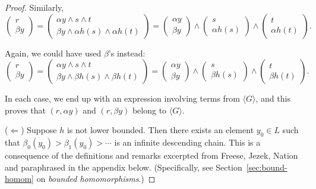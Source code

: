 \begin{proof}
Similarly,
\[\left(\begin{array}{c} r \\ \beta y\end{array}\right) = 
\left(\begin{array}{c} \alpha y \wedge s\wedge t \\ \beta y \wedge \alpha {h(s)} \wedge \alpha {h(t)} \end{array}\right) = 
\left(\begin{array}{c} \alpha y\\ \beta y\end{array}\right) \wedge 
\left(\begin{array}{c}s \\ \alpha {h(s)}\end{array}\right) \wedge \left(\begin{array}{c}t \\ \alpha {h(t)} \end{array}\right).\]

Again, we could have used $\beta$'s instead:
\[\left(\begin{array}{c} r \\ \beta y\end{array}\right) = 
\left(\begin{array}{c} \alpha y \wedge s\wedge t \\ \beta y \wedge \beta {h(s)} \wedge \beta {h(t)} \end{array}\right) = 
\left(\begin{array}{c} \alpha y\\ \beta y\end{array}\right) \wedge 
\left(\begin{array}{c}s \\ \beta {h(s)}\end{array}\right) \wedge \left(\begin{array}{c}t \\ \beta {h(t)} \end{array}\right).\]

In each case, we end up with an expression involving terms from $\langle G \rangle$, and this proves that $(r, \alpha y)$ and $(r, \beta y)$ belong to $\langle G \rangle$.

\medskip

\noindent ($\Leftarrow$) Suppose $h$ is not lower bounded. Then there exists an element $y_0\in L$ such that $\beta_0(y_0) > \beta_1(y_0) > \cdots$ is an infinite descending chain. This is a consequence of the definitions and remarks excerpted from Freese, Jezek, Nation~\cite{MR1319815} and paraphrased in the appendix below. (Specifically, see Section~\ref{sec:bound-homom} on \emph{bounded homomorphisms}.)


\end{proof}
